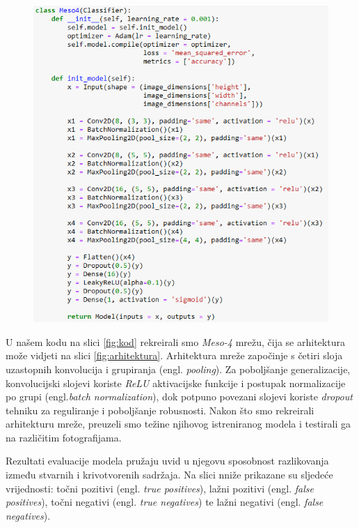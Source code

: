 \documentclass[seminarski, times, utf8]{fer}
\begin{document}
\begin{figure}[H]
\begin{minipage}[b]{0.45\linewidth}
         {\includegraphics[width=\linewidth]{slike/kod.png}}
   \end{minipage}

\end{figure}

U našem kodu na slici \ref{fig:kod} rekreirali smo \textit{Meso-4} mrežu, čija se arhitektura može vidjeti na slici \ref{fig:arhitektura}\cite{mesonet}. Arhitektura mreže započinje s četiri sloja uzastopnih konvolucija i grupiranja (engl. \textit{pooling}). Za poboljšanje generalizacije, konvolucijski slojevi koriste \textit{ReLU} aktivacijske funkcije i postupak normalizacije po grupi (engl.\textit{batch normalization}), dok potpuno povezani slojevi koriste \textit{dropout} tehniku za reguliranje i poboljšanje robusnosti. Nakon što smo rekreirali arhitekturu mreže, preuzeli smo težine njihovog istreniranog modela i testirali ga na različitim fotografijama. 

Rezultati evaluacije modela pružaju uvid u njegovu sposobnost razlikovanja između stvarnih i krivotvorenih sadržaja. Na slici nniže prikazane su sljedeće vrijednosti: točni pozitivi (engl. \textit{true positives}), lažni pozitivi (engl. \textit{false positives}), točni negativi (engl. \textit{true negatives}) te lažni negativi (engl. \textit{false negatives}).
\end{document}

